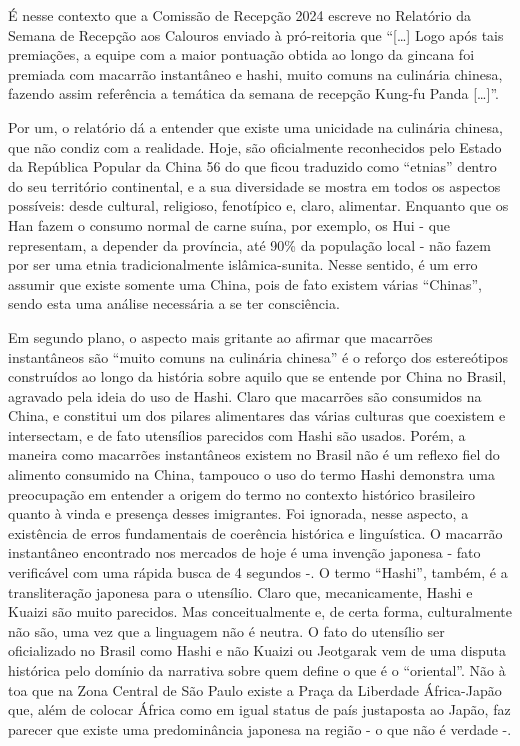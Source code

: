É nesse contexto que a Comissão de Recepção 2024 escreve no Relatório da Semana de Recepção aos Calouros enviado à pró-reitoria que “[…​] Logo após tais premiações, a equipe com a maior pontuação obtida ao longo da gincana foi premiada com macarrão instantâneo e hashi, muito comuns na culinária chinesa, fazendo assim referência a temática da semana de recepção Kung-fu Panda […​]”.

Por um, o relatório dá a entender que existe uma unicidade na culinária chinesa, que não condiz com a realidade. Hoje, são oficialmente reconhecidos pelo Estado da República Popular da China 56 do que ficou traduzido como “etnias” dentro do seu território continental, e a sua diversidade se mostra em todos os aspectos possíveis: desde cultural, religioso, fenotípico e, claro, alimentar. Enquanto que os Han fazem o consumo normal de carne suína, por exemplo, os Hui - que representam, a depender da província, até 90\% da população local - não fazem por ser uma etnia tradicionalmente islâmica-sunita. Nesse sentido, é um erro assumir que existe somente uma China, pois de fato existem várias “Chinas”, sendo esta uma análise necessária a se ter consciência.

Em segundo plano, o aspecto mais gritante ao afirmar que macarrões instantâneos são “muito comuns na culinária chinesa” é o reforço dos estereótipos construídos ao longo da história sobre aquilo que se entende por China no Brasil, agravado pela ideia do uso de Hashi. Claro que macarrões são consumidos na China, e constitui um dos pilares alimentares das várias culturas que coexistem e intersectam, e de fato utensílios parecidos com Hashi são usados. Porém, a maneira como macarrões instantâneos existem no Brasil não é um reflexo fiel do alimento consumido na China, tampouco o uso do termo Hashi demonstra uma preocupação em entender a origem do termo no contexto histórico brasileiro quanto à vinda e presença desses imigrantes. Foi ignorada, nesse aspecto, a existência de erros fundamentais de coerência histórica e linguística. O macarrão instantâneo encontrado nos mercados de hoje é uma invenção japonesa - fato verificável com uma rápida busca de 4 segundos -. O termo “Hashi”, também, é a transliteração japonesa para o utensílio. Claro que, mecanicamente, Hashi e Kuaizi são muito parecidos. Mas conceitualmente e, de certa forma, culturalmente não são, uma vez que a linguagem não é neutra. O fato do utensílio ser oficializado no Brasil como Hashi e não Kuaizi ou Jeotgarak vem de uma disputa histórica pelo domínio da narrativa sobre quem define o que é o “oriental”. Não à toa que na Zona Central de São Paulo existe a Praça da Liberdade África-Japão que, além de colocar África como em igual status de país justaposta ao Japão, faz parecer que existe uma predominância japonesa na região - o que não é verdade -.

